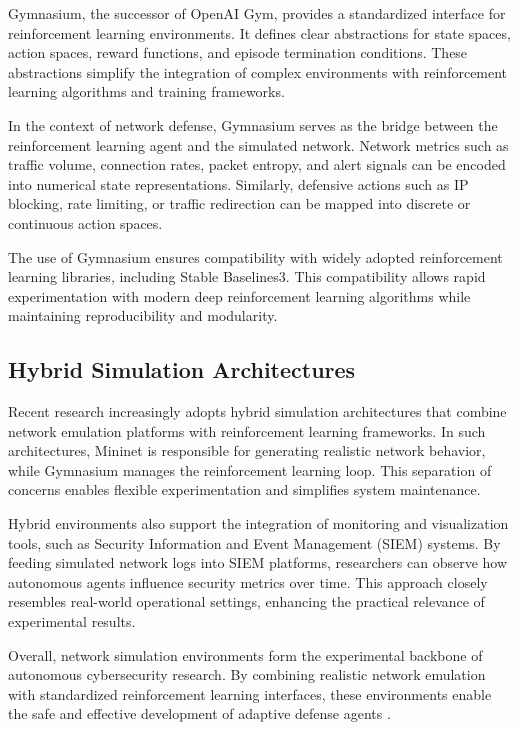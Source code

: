 \documentclass[12pt,a4paper]{report}
\begin{document}
Gymnasium, the successor of OpenAI Gym, provides a standardized interface for reinforcement learning environments.
It defines clear abstractions for state spaces, action spaces, reward functions, and episode termination conditions.
These abstractions simplify the integration of complex environments with reinforcement learning algorithms and training frameworks.

In the context of network defense, Gymnasium serves as the bridge between the reinforcement learning agent and the simulated network.
Network metrics such as traffic volume, connection rates, packet entropy, and alert signals can be encoded into numerical state representations.
Similarly, defensive actions such as IP blocking, rate limiting, or traffic redirection can be mapped into discrete or continuous action spaces.

The use of Gymnasium ensures compatibility with widely adopted reinforcement learning libraries, including Stable Baselines3.
This compatibility allows rapid experimentation with modern deep reinforcement learning algorithms while maintaining reproducibility and modularity.

\subsection{Hybrid Simulation Architectures}

Recent research increasingly adopts hybrid simulation architectures that combine network emulation platforms with reinforcement learning frameworks.
In such architectures, Mininet is responsible for generating realistic network behavior, while Gymnasium manages the reinforcement learning loop.
This separation of concerns enables flexible experimentation and simplifies system maintenance.

Hybrid environments also support the integration of monitoring and visualization tools, such as Security Information and Event Management (SIEM) systems.
By feeding simulated network logs into SIEM platforms, researchers can observe how autonomous agents influence security metrics over time.
This approach closely resembles real-world operational settings, enhancing the practical relevance of experimental results.

Overall, network simulation environments form the experimental backbone of autonomous cybersecurity research.
By combining realistic network emulation with standardized reinforcement learning interfaces, these environments enable the safe and effective development of adaptive defense agents \cite{lantzMininet2010,gymnasium2023}.
\end{document}

